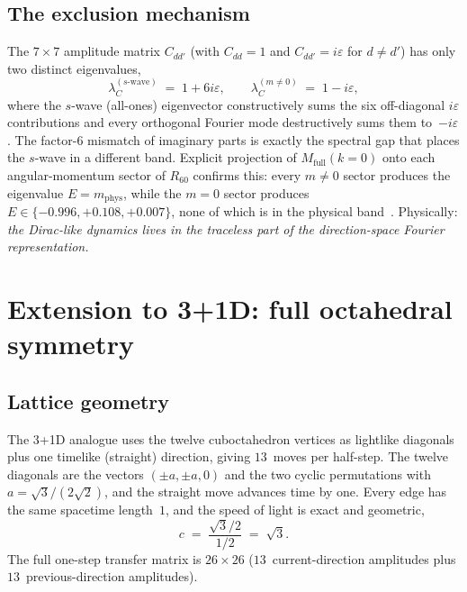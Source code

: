 \documentclass[twocolumn,showpacs,preprintnumbers,amsmath,amssymb]{revtex4-2}
\newcommand{\eps}{\varepsilon}
\newcommand{\mphys}{m_{\mathrm{phys}}}
\begin{document}
\subsection{The exclusion mechanism}

The $7{\times}7$ amplitude matrix $C_{dd'}$ (with $C_{dd}=1$ and
$C_{dd'}=i\eps$ for $d\neq d'$) has only two distinct eigenvalues,
\begin{equation}
  \lambda_{C}^{(s\text{-wave})} \;=\; 1+6i\eps,
  \qquad
  \lambda_{C}^{(m\neq 0)} \;=\; 1-i\eps,
  \label{eq:gap}
\end{equation}
where the $s$-wave (all-ones) eigenvector constructively sums the six
off-diagonal $i\eps$ contributions and every orthogonal Fourier mode
destructively sums them to~$-i\eps$.
The factor-$6$ mismatch of imaginary parts is exactly the spectral gap
that places the $s$-wave in a different band.
Explicit projection of $M_{\mathrm{full}}(k=0)$ onto each
angular-momentum sector of $R_{60}$ confirms this: every $m\neq 0$ sector
produces the eigenvalue $E=\mphys$, while the $m=0$ sector produces
$E\in\{-0.996,+0.108,+0.007\}$, none of which is in the physical
band~\cite{schmiereck2026}.
Physically: \emph{the Dirac-like dynamics lives in the traceless part of
the direction-space Fourier representation.}

\section{Extension to 3+1D: full octahedral symmetry}
\label{sec:3d}

\subsection{Lattice geometry}

The \mbox{3\!+\!1D} analogue uses the twelve cuboctahedron vertices as
lightlike diagonals plus one timelike (straight) direction, giving
$13$~moves per half-step.
The twelve diagonals are the vectors
$(\pm a,\pm a, 0)$ and the two cyclic permutations with
$a=\sqrt{3}/(2\sqrt{2})$, and the straight move advances time by one.
Every edge has the same spacetime length~$1$, and the speed of light is
exact and geometric,
\begin{equation}
  c \;=\; \frac{\sqrt{3}/2}{1/2} \;=\; \sqrt{3}.
\end{equation}
The full one-step transfer matrix is $26\times 26$
($13$~current-direction amplitudes plus $13$~previous-direction amplitudes).
\end{document}
